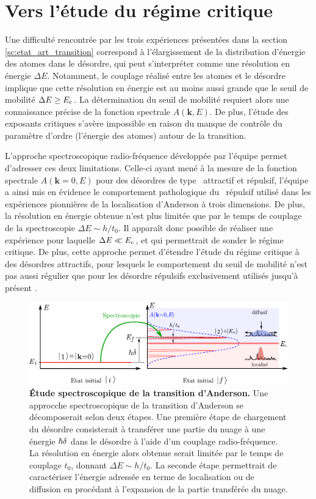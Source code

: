 \section{Vers l'étude du régime critique}
Une difficulté rencontrée par les trois expériences présentées dans la section \ref{sc:etat_art_transition} correspond à l'élargissement de la distribution d'énergie des atomes dans le désordre, qui peut s'interpréter comme une résolution en énergie $\Delta E$. Notamment, le couplage réalisé entre les atomes et le désordre implique que cette résolution en énergie est au moins aussi grande que le seuil de mobilité $\Delta E \geq E_{\mathrm{c}}$. La détermination du seuil de mobilité requiert alors une connaissance précise de la fonction spectrale $A(\mathbf{k},E)$. De plus, l'étude des exposants critiques s'avère impossible en raison du manque de contrôle du paramètre d'ordre (l'énergie des atomes) autour de la transition. 

L'approche spectroscopique radio-fréquence développée par l'équipe permet d'adresser ces deux limitations. Celle-ci ayant mené à la mesure de la fonction spectrale $A(\mathbf{k}=0,E)$ pour des désordres de type \speckle\ attractif et répulsif, l'équipe a ainsi mis en évidence le comportement pathologique du \speckle\ répulsif utilisé dans les expériences pionnières de la localisation d'Anderson à trois dimensions. De plus, la résolution en énergie obtenue n'est plus limitée que par le temps de couplage de la spectroscopie $\Delta E \sim h/t_0$. Il apparaît donc possible de réaliser une expérience pour laquelle $\Delta E \ll E_{\mathrm{c}}$, et qui permettrait de sonder le régime critique. De plus, cette approche permet d'étendre l'étude du régime critique à des désordres attractifs, pour lesquels le comportement du seuil de mobilité n'est pas aussi régulier que pour les désordre répulsifs exclusivement utilisés jusqu'à présent \citep{delande2014mobility}.

\begin{figure}
\centering
\includegraphics[width=\textwidth]{Fig/Conclusion/spectro_transition_anderson.pdf}
\caption{\textbf{Étude spectroscopique de la transition d'Anderson.} Une approcche spectroscopique de la transition d'Anderson se décomposerait selon deux étapes. Une première étape de chargement du désordre consisterait à transférer une partie du nuage à une énergie $\hslash\delta$ dans le désordre à l'aide d'un couplage radio-fréquence. La résolution en énergie alors obtenue serait limitée par le temps de couplage $t_0$, donnant $\Delta E \sim h/t_0$. La seconde étape permettrait de caractériser l'énergie adressée en terme de localisation ou de diffusion en procédant à l'expansion de la partie transférée du nuage.}
\label{fig:spectro_transition_anderson}
\end{figure}

